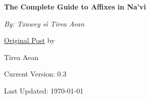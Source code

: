 \documentclass[12pt,a4paper,titlepage, dvipsnames]{book}
\begin{document}
\begin{titlepage}
	\centering
	\vspace*{3.5cm}
	\vspace*{1.5cm}

	{\huge\bfseries The Complete Guide to Affixes in Na'vi\par}
	\vspace{2cm}
	{\Large\itshape By: Txawey sì Tirea Aean\par}
	\vfill
	\href{https://forum.learnnavi.org/prefixes-infixes-and-suffixes/easy-guide-to-navi-prefixes-infixes-and-suffixes-ii/}{Original Post} by\par
	Tirea Aean 

	\vspace{2cm}
	\vfill
\scriptsize Current Version: 0.3\par
\scriptsize Last Updated: \today\par
\end{titlepage}
\tableofcontents





\printindex
\end{document}
